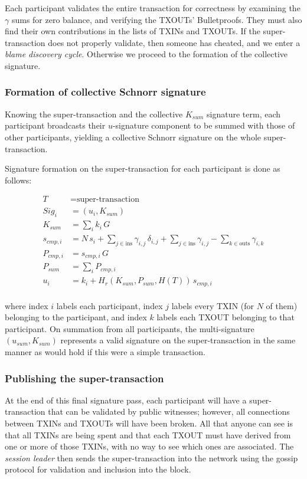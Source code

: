 \documentclass[a4paper, 10pt, conference]{ieeeconf}
\begin{document}
Each participant validates the entire transaction for correctness by examining the $\gamma$ sums for zero balance, and verifying the TXOUTs' Bulletproofs. They must also find their own contributions in the lists of TXINs and TXOUTs. If the super-transaction does not properly validate, then someone has cheated, and we enter a \textit{blame discovery cycle}. Otherwise we proceed to the formation of the collective signature. 

\subsubsection{Formation of collective Schnorr signature} Knowing the super-transaction and the collective $K_{sum}$ signature term, each participant broadcasts their $u$-signature component to be summed with those of other participants, yielding a collective Schnorr signature on the whole super-transaction.

Signature formation on the super-transaction for each participant is done as follows:

\begin{align*}
T &= \text{super-transaction} \\
Sig_i &= (u_i, K_{sum}) \\
K_{sum} &= \sum_i{k_i \, G} \\
s_{cmp,i} &= N \, s_i + \sum_{j \in \text{ins}} {\gamma_{i,j} \, \delta_{i,j}} + \sum_{j \in \text{ins}} {\gamma_{i,j}} - \sum_{k \in \text{outs}} {\gamma_{i,k}} \\
P_{cmp,i} &= s_{cmp,i} \, G \\
P_{sum} &= \sum_i{P_{cmp,i}}\\
u_i &= k_i + H_r(K_{sum} , P_{sum},  H(T)) \,  s_{cmp,i}\\
\end{align*}

where index $i$ labels each participant, index $j$ labels every TXIN (for $N$ of them) belonging to the participant, and index $k$ labels each TXOUT belonging to that participant. On summation from all participants, the multi-signature $(u_{sum}, K_{sum})$ represents a valid signature on the super-transaction in the same manner as would hold if this were a simple transaction.

\subsubsection{Publishing the super-transaction} At the end of this final signature pass, each participant will have a super-transaction that can be validated by public witnesses; however, all connections between TXINs and TXOUTs will have been broken. All that anyone can see is that all TXINs are being spent and that each TXOUT must have derived from one or more of those TXINs, with no way to see which ones are associated. The \textit{session leader} then sends the super-transaction into the network using the gossip protocol for validation and inclusion into the block.
\end{document}
